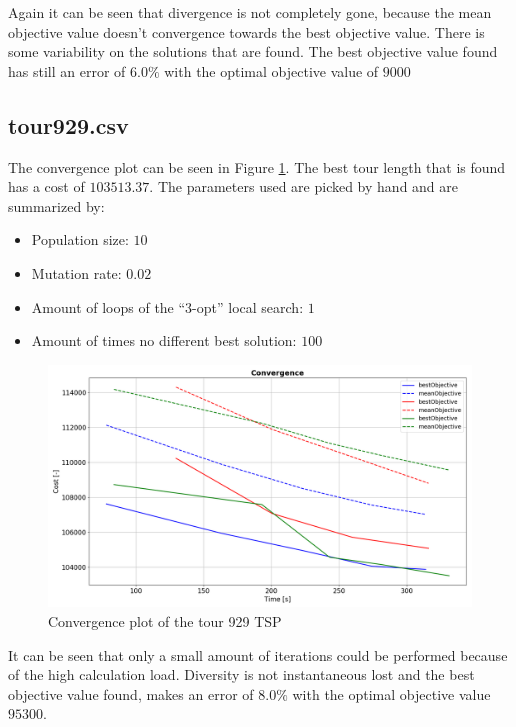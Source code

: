 \documentclass[a4paper,10pt]{article}
\begin{document}
Again it can be seen that divergence is not completely gone, because the mean objective value doesn't convergence towards the best objective value. There is some variability on the solutions that are found. The best objective value found has still an error of $ 6.0 \% $ with the optimal objective value of $ 9000 $


\subsection{tour929.csv}
The convergence plot can be seen in Figure \ref{fig:convergence_tour9292}.
The best tour length that is found  has a cost of $  103513.37 $.
The parameters used are picked by hand and are summarized by: 
\begin{itemize}
	\item Population size: $ 10 $
	\item Mutation rate: $ 0.02 $
	\item Amount of loops of the ``3-opt'' local search: $ 1 $
	\item Amount of times no different best solution: $ 100 $ 
\end{itemize}


\begin{figure}[h!]
	\includegraphics[width=1.0\textwidth]{convergence_tour9292.PNG}
	\caption{Convergence plot of the tour 929 TSP}
	\label{fig:convergence_tour9292}
	\centering
\end{figure}

It can be seen that only a small amount of iterations could be performed because of the high calculation load. Diversity is not instantaneous lost and the best objective value found, makes an error of $ 8.0 \% $ with the optimal objective value $ 95300 $.

\clearpage
\end{document}
